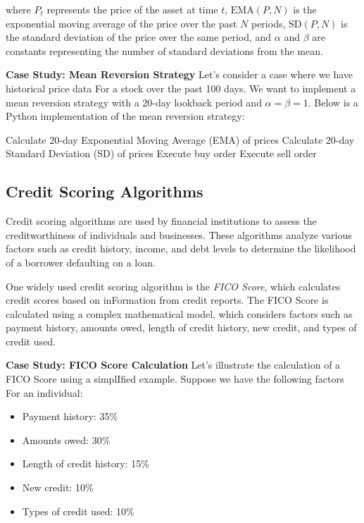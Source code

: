 \documentclass[12pt]{book} %
\begin{document}
where $P_t$ represents the price of the asset at time $t$, $\text{EMA}(P, N)$ is the exponential moving average of the price over the past $N$ periods, $\text{SD}(P, N)$ is the standard deviation of the price over the same period, and $\alpha$ and $\beta$ are constants representing the number of standard deviations from the mean.

\textbf{Case Study: Mean Reversion Strategy}
Let's consider a case where we have historical price data For a stock over the past 100 days. We want to implement a mean reversion strategy with a 20-day lookback period and $\alpha = \beta = 1$. Below is a Python implementation of the mean reversion strategy:
\FloatBarrier
\begin{algorithm}
\caption{Mean Reversion Strategy}
\begin{algorithmic}[1]
\State Calculate 20-day Exponential Moving Average (EMA) of prices
\State Calculate 20-day Standard Deviation (SD) of prices
\State Execute buy order
\State Execute sell order
\EndIf
\end{algorithmic}
\end{algorithm}
\FloatBarrier

\subsection{Credit Scoring Algorithms}
Credit scoring algorithms are used by financial institutions to assess the creditworthiness of individuals and businesses. These algorithms analyze various factors such as credit history, income, and debt levels to determine the likelihood of a borrower defaulting on a loan.

One widely used credit scoring algorithm is the \textit{FICO Score}, which calculates credit scores based on inFormation from credit reports. The FICO Score is calculated using a complex mathematical model, which considers factors such as payment history, amounts owed, length of credit history, new credit, and types of credit used.

\textbf{Case Study: FICO Score Calculation}
Let's illustrate the calculation of a FICO Score using a simplIfied example. Suppose we have the following factors For an individual:
\begin{itemize}
\item Payment history: 35\%
\item Amounts owed: 30\%
\item Length of credit history: 15\%
\item New credit: 10\%
\item Types of credit used: 10\%
\end{itemize}
\end{document}
